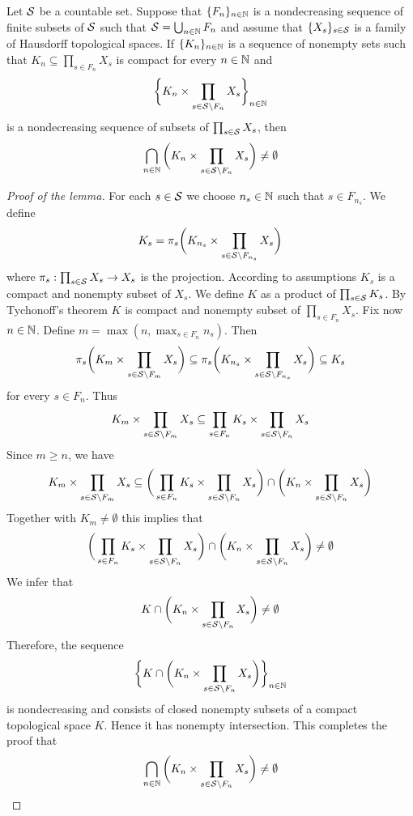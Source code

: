 \begin{lemma}\label{lemma:topological_part_kolmogorov_extension}
Let ${\mathcal S}$ be a countable set. Suppose that $\{F_n\}_{n\in {\mathbb N}}$ is a nondecreasing sequence of finite subsets of ${\mathcal S}$ such that ${\mathcal S} = \bigcup_{n\in {\mathbb N}}F_n$ and assume that $\{X_s\}_{s\in {\mathcal S}}$ is a family of Hausdorff topological spaces. If $\{K_n\}_{n\in {\mathbb N}}$ is a sequence of nonempty sets such that $K_n\subseteq \prod_{s\in F_n}X_s$ is compact for every $n\in {\mathbb N}$ and 
$$\bigg\{K_n\times \prod_{s\in {\mathcal S}\setminus F_n}X_s\bigg\}_{n\in {\mathbb N}}$$
is a nondecreasing sequence of subsets of $\prod_{s\in {\mathcal S}}X_s$, then
$$\bigcap_{n\in {\mathbb N}}\bigg(K_n\times \prod_{s\in {\mathcal S}\setminus F_n}X_s\bigg) \neq \emptyset$$
\end{lemma}
\begin{proof}[Proof of the lemma]
For each $s\in {\mathcal S}$ we choose $n_s\in {\mathbb N}$ such that $s \in F_{n_s}$. We define 
$$K_{s} = \pi_{s}\bigg(K_{n_s}\times \prod_{s\in {\mathcal S}\setminus F_{n_s}}X_s\bigg)$$
where $\pi_s:\prod_{s\in {\mathcal S}}X_s\rightarrow X_s$ is the projection. According to assumptions $K_{s}$ is a compact and nonempty subset of $X_s$. We define $K$ as a product of $\prod_{s\in {\mathcal S}}K_s$. By Tychonoff's theorem $K$ is compact and nonempty subset of $\prod_{s\in F_n}X_s$. Fix now $n\in {\mathbb N}$. Define $m = \max\left(n,\max_{s\in F_n}n_s\right)$. Then
$$\pi_s\bigg(K_{m}\times \prod_{s\in {\mathcal S}\setminus F_{m}}X_s\bigg) \subseteq \pi_s\bigg(K_{n_s}\times \prod_{s\in {\mathcal S}\setminus F_{n_s}}X_s\bigg)\subseteq K_s$$
for every $s\in F_n$. Thus
$$K_{m}\times \prod_{s\in {\mathcal S}\setminus F_{m}}X_s \subseteq \prod_{s\in F_n}K_s\times \prod_{s\in {\mathcal S}\setminus F_n}X_s$$
Since $m\geq n$, we have
$$K_{m}\times \prod_{s\in {\mathcal S}\setminus F_{m}}X_s \subseteq \bigg(\prod_{s\in F_n}K_s\times \prod_{s\in {\mathcal S}\setminus F_n}X_s\bigg)\cap \bigg(K_n\times \prod_{s\in {\mathcal S}\setminus F_n}X_s\bigg)$$
Together with $K_m\neq \emptyset$ this implies that
$$\bigg(\prod_{s\in F_n}K_s\times \prod_{s\in {\mathcal S}\setminus F_n}X_s\bigg)\cap \bigg(K_n\times \prod_{s\in {\mathcal S}\setminus F_n}X_s\bigg)\neq \emptyset$$
We infer that
$$K\cap \bigg(K_n\times \prod_{s\in {\mathcal S}\setminus F_n}X_s\bigg) \neq \emptyset$$
Therefore, the sequence 
$$\bigg\{K\cap \bigg(K_n\times \prod_{s\in {\mathcal S}\setminus F_n}X_s\bigg)\bigg\}_{n\in {\mathbb N}}$$
is nondecreasing and consists of closed nonempty subsets of a compact topological space $K$. Hence it has nonempty intersection. This completes the proof that
$$\bigcap_{n\in {\mathbb N}}\bigg(K_n\times \prod_{s\in {\mathcal S}\setminus F_n}X_s\bigg) \neq \emptyset$$
\end{proof}


